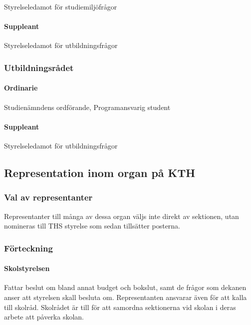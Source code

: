 \documentclass{dgovdoc}
\begin{document}
Styrelseledamot för studiemiljöfrågor

\paragraph{Suppleant}

Styrelseledamot för utbildningsfrågor

\subsubsection{Utbildningsrådet}

\paragraph{Ordinarie}

Studienämndens ordförande, Programansvarig student

\paragraph{Suppleant}

Styrelseledamot för utbildningsfrågor

\subsection{Representation inom organ på KTH}

\subsubsection{Val av representanter}

Representanter till många av dessa organ väljs inte direkt av sektionen, utan
nomineras till THS styrelse som sedan tillsätter posterna.

\subsubsection{Förteckning}

\paragraph{Skolstyrelsen}

Fattar beslut om bland annat budget och bokslut, samt de frågor som dekanen
anser att styrelsen skall besluta om. Representanten ansvarar även för att
kalla till skolråd. Skolrådet är till för att samordna sektionerna vid skolan i
deras arbete att påverka skolan.
\end{document}
